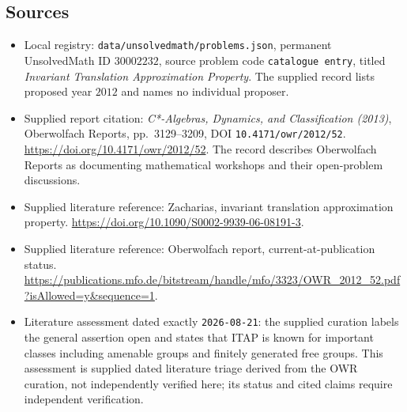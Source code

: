 \documentclass[11pt]{article}
\begin{document}
\subsection{Sources}
\begin{itemize}
\item Local registry: \texttt{data/unsolvedmath/problems.json}, permanent UnsolvedMath ID \(30002232\), source problem code \texttt{catalogue entry}, titled \emph{Invariant Translation Approximation Property}. The supplied record lists proposed year \(2012\) and names no individual proposer.
\item Supplied report citation: \emph{C*-Algebras, Dynamics, and Classification (2013)}, Oberwolfach Reports, pp.~3129--3209, DOI \texttt{10.4171/owr/2012/52}. \url{https://doi.org/10.4171/owr/2012/52}. The record describes Oberwolfach Reports as documenting mathematical workshops and their open-problem discussions.
\item Supplied literature reference: Zacharias, invariant translation approximation property. \url{https://doi.org/10.1090/S0002-9939-06-08191-3}.
\item Supplied literature reference: Oberwolfach report, current-at-publication status. \url{https://publications.mfo.de/bitstream/handle/mfo/3323/OWR_2012_52.pdf?isAllowed=y&sequence=1}.
\item Literature assessment dated exactly \texttt{2026-08-21}: the supplied curation labels the general assertion open and states that ITAP is known for important classes including amenable groups and finitely generated free groups. This assessment is supplied dated literature triage derived from the OWR curation, not independently verified here; its status and cited claims require independent verification.
\end{itemize}
\end{document}
